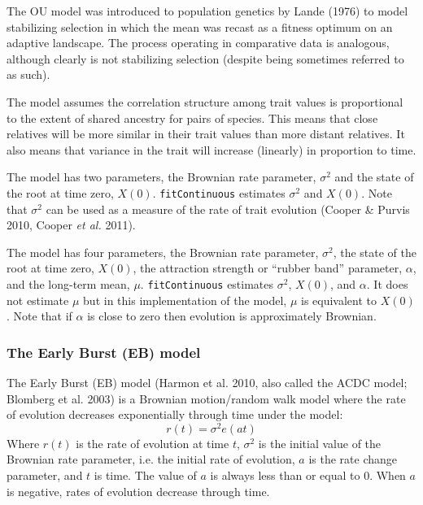 \documentclass[11pt]{article}
\begin{document}
The OU model was introduced to population genetics by Lande (1976) to model stabilizing selection in which the mean was recast as a fitness optimum on an adaptive landscape. The process operating in comparative data is analogous, although clearly is not stabilizing selection (despite being sometimes referred to as such). 



The model assumes the correlation structure among trait values is proportional to the extent of shared ancestry for pairs of species. This means that close relatives will be more similar in their trait values than more distant relatives. It also means that variance in the trait will increase (linearly) in proportion to time. 

The model has two parameters, the Brownian rate parameter, $\sigma^2$ and the state of the root at time zero, $X(0)$. \texttt{fitContinuous} estimates $\sigma^2$ and $X(0)$. Note that $\sigma^2$ can be used as a measure of the rate of trait evolution (Cooper \& Purvis 2010, Cooper \textit{et al.} 2011). 

The model has four parameters, the Brownian rate parameter, $\sigma^2$, the state of the root at time zero, $X(0)$, the attraction strength or ``rubber band'' parameter, $\alpha$, and the long-term mean, $\mu$. \texttt{fitContinuous} estimates $\sigma^2$, $X(0)$, and $\alpha$. It does not estimate $\mu$ but in this implementation of the model, $\mu$ is equivalent to $X(0)$. Note that if $\alpha$ is close to zero then evolution is approximately Brownian.

\subsubsection{The Early Burst (EB) model}

The Early Burst (EB) model (Harmon et al. 2010, also called the ACDC model; Blomberg et al. 2003) is a Brownian motion/random walk model where the rate of evolution decreases exponentially through time under the model:
\begin{equation}
r(t) = \sigma^2e(at)
\end{equation}
Where $r(t)$ is the rate of evolution at time $t$, $\sigma^2$ is the initial value of the Brownian rate parameter, i.e. the initial rate of evolution, $a$ is the rate change parameter, and $t$ is time. The value of $a$ is always less than or equal to 0. When $a$ is negative, rates of evolution decrease through time.
\end{document}
